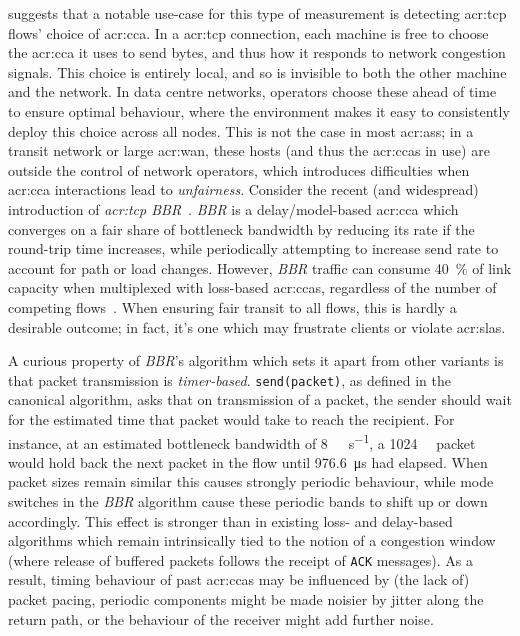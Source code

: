 

 suggests that a notable use-case for this type of measurement is detecting \gls{acr:tcp} flows' choice of \gls{acr:cca}.
In a \gls{acr:tcp} connection, each machine is free to choose the \gls{acr:cca} it uses to send bytes, and thus how it responds to network congestion signals.
This choice is entirely local, and so is invisible to both the other machine and the network.
In data centre networks, operators choose these ahead of time to ensure optimal behaviour, where the environment makes it easy to consistently deploy this choice across all nodes.
This is not the case in most \glspl{acr:as}; in a transit network or large \gls{acr:wan}, these hosts (and thus the \glspl{acr:cca} in use) are outside the control of network operators, which introduces difficulties when \gls{acr:cca} interactions lead to \emph{unfairness}.
Consider the recent (and widespread) introduction of \emph{\gls{acr:tcp} BBR}~\parencite{DBLP:journals/queue/CardwellCGYJ16}.
\emph{BBR} is a delay/model-based \gls{acr:cca} which converges on a fair share of bottleneck bandwidth by reducing its rate if the round-trip time increases, while periodically attempting to increase send rate to account for path or load changes.
However, \emph{BBR} traffic can consume \qty{40}{\percent} of link capacity when multiplexed with loss-based \glspl{acr:cca}, regardless of the number of competing flows~\parencite{DBLP:conf/imc/WareMSS19}. 
When ensuring fair transit to all flows, this is hardly a desirable outcome; in fact, it's one which may frustrate clients or violate \glspl{acr:sla}.

A curious property of \emph{BBR}'s algorithm which sets it apart from other variants is that packet transmission is \emph{timer-based}.
\texttt{send(packet)}, as defined in the canonical algorithm, asks that on transmission of a packet, the sender should wait for the estimated time that packet would take to reach the recipient.
For instance, at an estimated bottleneck bandwidth of \qty{8}{\mega\bit\per\second}, a \qty{1024}{\kilo\byte} packet would hold back the next packet in the flow until \qty{976.6}{\micro\second} had elapsed.
When packet sizes remain similar this causes strongly periodic behaviour, while mode switches in the \emph{BBR} algorithm cause these periodic bands to shift up or down accordingly.
This effect is stronger than in existing loss- and delay-based algorithms which remain intrinsically tied to the notion of a congestion window (where release of buffered packets follows the receipt of \texttt{ACK} messages).
As a result, timing behaviour of past \glspl{acr:cca} may be influenced by (the lack of) packet pacing, periodic components might be made noisier by jitter along the return path, or the behaviour of the receiver might add further noise.

